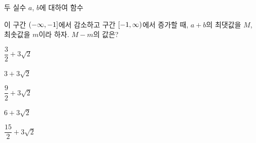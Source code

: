 두 실수 $a$, $b$에 대하여 함수 \par\smallskip{}\par\smallskip\noindent 이 구간 $(-\infty{,}\mkern3mu\mathopen{}-1]$에서 감소하고 구간 $[-1{,}\mkern3mu\mathopen{}\infty)$에서 증가할 때, $a+b$의 최댓값을 $M$, 최솟값을 $m$이라 하자. $M-m$의 값은?
\begin{choices32}{\rule[-3ex]{0pt}{8ex}$\dfrac{3}{2}+3\sqrt{2}$}{\rule[-3ex]{0pt}{8ex}$3+3\sqrt{2}$}{\rule[-3ex]{0pt}{8ex}$\dfrac{9}{2}+3\sqrt{2}$}{\rule[-3ex]{0pt}{8ex}$6+3\sqrt{2}$}{\rule[-3ex]{0pt}{8ex}$\dfrac{15}{2}+3\sqrt{2}$}\end{choices32}
